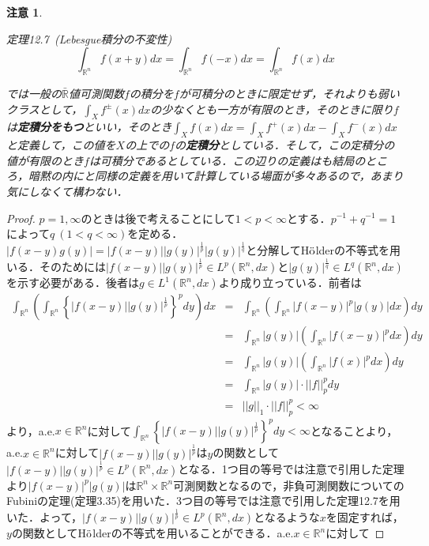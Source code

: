 \documentclass[a4paper,11pt]{jsarticle}
\newtheorem{proof}{証明}
\newtheorem{attention}{注意}
\begin{document}
\begin{attention}
\begin{itembox}[l]{定理12.7{\ }(Lebesgue積分の不変性)}
\begin{equation*}
\int_{\mathbb{R}^n}f(x+y)dx=\int_{\mathbb{R}^n}f(-x)dx=\int_{\mathbb{R}^n}f(x)dx
\end{equation*}
\end{itembox}
\cite{ito}では一般の$\bar{\mathbb{R}}$値可測関数$f$の積分を$f$が可積分のときに限定せず，それよりも弱いクラスとして，$\int_Xf^\pm(x)dx$の少なくとも一方が有限のとき，そのときに限り$f$は{\bf 定積分をもつ}といい，そのとき$\int_Xf(x)dx=\int_Xf^+(x)dx-\int_Xf^-(x)dx$と定義して，この値を$X$の上での$f$の{\bf 定積分}としている．そして，この定積分の値が有限のとき$f$は可積分であるとしている．この辺りの定義は\cite{kotani}も結局のところ，暗黙の内に\cite{ito}と同様の定義を用いて計算している場面が多々あるので，あまり気にしなくて構わない．
\end{attention}
\begin{proof}
$p=1,\infty$のときは後で考えることにして$1<p<\infty$とする．$p^{-1}+q^{-1}=1$によって$q{\ }(1<q<\infty)$を定める．$|f(x-y)g(y)|=|f(x-y)||g(y)|^{\frac{1}{p}}|g(y)|^{\frac{1}{q}}$と分解してH${\rm \ddot{o}}$lderの不等式を用いる．そのためには$|f(x-y)||g(y)|^{\frac{1}{p}}\in L^p(\mathbb{R}^n,dx)$と$|g(y)|^{\frac{1}{q}}\in L^q(\mathbb{R}^n,dx)$を示す必要がある．後者は$g\in L^1(\mathbb{R}^n,dx)$より成り立っている．前者は
\begin{eqnarray*}
\int_{\mathbb{R}^n}\left(\int_{\mathbb{R}^n}\left\{|f(x-y)||g(y)|^{\frac{1}{p}}\right\}^p dy\right)dx&=&\int_{\mathbb{R}^n}\left(\int_{\mathbb{R}^n}|f(x-y)|^p|g(y)| dx\right)dy \\
&=&\int_{\mathbb{R}^n}|g(y)|\left(\int_{\mathbb{R}^n}|f(x-y)|^p dx\right)dy \\
&=&\int_{\mathbb{R}^n}|g(y)|\left(\int_{\mathbb{R}^n}|f(x)|^p dx\right)dy \\
&=&\int_{\mathbb{R}^n}|g(y)|\cdot ||f||_p^pdy \\
&=&||g||_1\cdot ||f||_p^p<\infty
\end{eqnarray*}
より，a.e.$x\in\mathbb{R}^n$に対して$\int_{\mathbb{R}^n}\left\{|f(x-y)||g(y)|^{\frac{1}{p}}\right\}^p dy<\infty$となることより，a.e.$x\in\mathbb{R}^n$に対して$|f(x-y)||g(y)|^{\frac{1}{p}}$は$y$の関数として$|f(x-y)||g(y)|^{\frac{1}{p}}\in L^p(\mathbb{R}^n,dx)$となる．1つ目の等号では注意で引用した定理より$|f(x-y)|^p|g(y)|$は$\mathbb{R}^n\times\mathbb{R}^n$可測関数となるので，非負可測関数についてのFubiniの定理(定理3.35)を用いた．3つ目の等号では注意で引用した定理12.7を用いた．よって，$|f(x-y)||g(y)|^{\frac{1}{p}}\in L^p(\mathbb{R}^n,dx)$となるような$x$を固定すれば，$y$の関数としてH${\rm \ddot{o}}$lderの不等式を用いることができる．a.e.$x\in\mathbb{R}^n$に対して

\end{proof}
\end{document}

